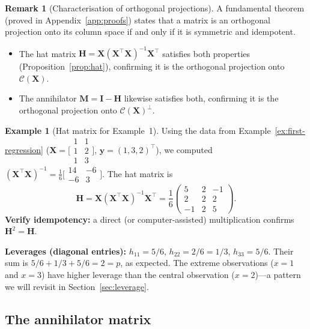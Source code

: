 \documentclass[11pt,a4paper]{article}
\theoremstyle{plain}
\theoremstyle{definition}
\newtheorem{example}[theorem]{Example}
\newtheorem{remark}[theorem]{Remark}
\newcommand{\bX}{\bm{X}}
\newcommand{\by}{\bm{y}}
\newcommand{\bH}{\bm{H}}
\newcommand{\bM}{\bm{M}}
\newcommand{\bI}{\bm{I}}
\newcommand{\Col}{\mathcal{C}}
\begin{document}
\begin{remark}[Characterisation of orthogonal projections]
A fundamental theorem (proved in Appendix~\ref{app:proofs}) states that a
matrix is an orthogonal projection onto its column space if and only if it
is symmetric and idempotent.
\begin{itemize}[nosep]
  \item The hat matrix $\bH = \bX(\bX^\top\bX)^{-1}\bX^\top$ satisfies both
        properties (Proposition~\ref{prop:hat}), confirming it is the orthogonal
        projection onto $\Col(\bX)$.
  \item The annihilator $\bM = \bI - \bH$ likewise satisfies both, confirming
        it is the orthogonal projection onto $\Col(\bX)^\perp$.
\end{itemize}
\end{remark}

\begin{example}[Hat matrix for Example~1]\label{ex:hat-numerical}
Using the data from Example~\ref{ex:first-regression}
($\bX = \bigl[\begin{smallmatrix}1&1\\1&2\\1&3\end{smallmatrix}\bigr]$,
$\by = (1,3,2)^\top$),
we computed $(\bX^\top\bX)^{-1} = \tfrac{1}{6}\bigl[\begin{smallmatrix}14&-6\\-6&3\end{smallmatrix}\bigr]$.
The hat matrix is
\[
  \bH = \bX(\bX^\top\bX)^{-1}\bX^\top
  = \frac{1}{6}\begin{pmatrix}5 & 2 & -1\\ 2 & 2 & 2\\ -1 & 2 & 5\end{pmatrix}.
\]
\textbf{Verify idempotency:} a direct (or computer-assisted) multiplication confirms $\bH^2 = \bH$.

\textbf{Leverages (diagonal entries):}
$h_{11} = 5/6$, $h_{22} = 2/6 = 1/3$, $h_{33} = 5/6$.
Their sum is $5/6 + 1/3 + 5/6 = 2 = p$, as expected.
The extreme observations ($x=1$ and $x=3$) have higher leverage than the central observation ($x=2$)---a pattern we will revisit in Section~\ref{sec:leverage}.
\end{example}

\subsection{The annihilator matrix}
\end{document}
